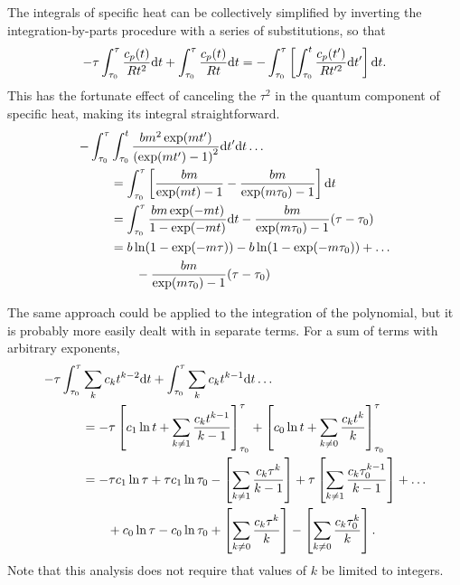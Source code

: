 The integrals of specific heat can be collectively simplified by inverting the integration-by-parts procedure with a series of substitutions, so that
\begin{align}
-\tau \int_{\tau_0}^\tau \frac{c_p(t)}{Rt^2} \mathrm{d} t + \int_{\tau_0}^\tau \frac{c_p(t)}{Rt} \mathrm{d} t = - \int_{\tau_0}^\tau \left[ \int_{\tau_0}^t \frac{c_p(t')}{Rt'^2} \mathrm{d} t'\right] \mathrm{d} t.
\end{align}
This has the fortunate effect of canceling the $\tau^2$ in the quantum component of specific heat, making its integral straightforward.
\begin{align}
-\int_{\tau_0}^\tau &\int_{\tau_0}^t \frac{b m^2 \exp(m t')}{\left(\exp(m t') - 1\right)^2} \mathrm{d} t' \mathrm{d} t  \ldots\nonumber\\
 &= \int_{\tau_0}^\tau \left[ \frac{b m}{\exp(m t) - 1} - \frac{b m}{\exp(m \tau_0) - 1} \right] \mathrm{d} t \nonumber\\
 &= \int_{\tau_0}^\tau \frac{b m\exp(-mt)}{1 - \exp(-mt)}\mathrm{d} t - \frac{b m}{\exp(m\tau_0)-1}(\tau - \tau_0) \nonumber\\
 &= b\ln(1-\exp(-m\tau)) - b\ln(1-\exp(-m\tau_0)) + \ldots\nonumber\\
 & \hspace{2em} -\frac{b m}{\exp(m\tau_0)-1}(\tau - \tau_0)
\end{align}

The same approach could be applied to the integration of the polynomial, but it is probably more easily dealt with in separate terms.  For a sum of terms with arbitrary exponents,
\begin{align}
-\tau \int_{\tau_0}^\tau &\sum_k c_k t^{k-2} \mathrm{d} t + \int_{\tau_0}^\tau \sum_k c_k t^{k-1} \mathrm{d} t \ldots \nonumber\\
&= -\tau \left[c_1 \ln t + \sum_{k\ne 1} \frac{c_k t^{k-1}}{k-1} \right]_{\tau_0}^\tau  + \left[c_0 \ln t + \sum_{k\ne 0} \frac{c_k t^{k}}{k} \right]_{\tau_0}^\tau\nonumber\\
&= - \tau c_1 \ln \tau + \tau c_1 \ln \tau_0 - \left[\sum_{k\ne 1} \frac{c_k \tau^k}{k-1}\right] + \tau \left[\sum_{k\ne 1} \frac{c_k \tau_0^{k-1}}{k-1} \right] + \ldots\nonumber\\
&\hspace{2em}  + c_0 \ln \tau - c_0 \ln \tau_0 + \left[ \sum_{k\ne 0} \frac{c_k \tau^{k}}{k} \right] - \left[ \sum_{k\ne 0} \frac{c_k \tau_0^{k}}{k} \right].
\end{align}
Note that this analysis does not require that values of $k$ be limited to integers.


